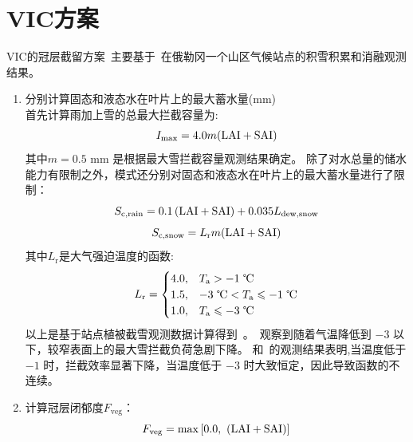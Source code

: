 \section{VIC方案}
VIC的冠层截留方案~\citep{liang1994simple,hamman2018variable}主要基于~\citet{storck2002measurement}在俄勒冈一个山区气候站点的积雪积累和消融观测结果。
\begin{enumerate}
  \item 分别计算固态和液态水在叶片上的最大蓄水量(mm)\\
    首先计算雨加上雪的总最大拦截容量为:
    \begin{equation}
      I_{\mathrm{max}} = 4.0 m ({\rm LAI}+{\rm SAI})
    \end{equation}
    其中$m=0.5$ mm 是根据最大雪拦截容量观测结果确定。
    除了对水总量的储水能力有限制之外，模式还分别对固态和液态水在叶片上的最大蓄水量进行了限制：
    \begin{equation}
      S_{\mathrm{c,rain}}=0.1\left({\rm LAI}+{\rm SAI}\right)+0.035 L_{\mathrm{dew,snow}}\\
    \end{equation}
    \begin{equation}
      S_{\mathrm{c,snow}}=L_{\mathrm {r}}  m ({\rm LAI}+{\rm SAI})
    \end{equation}
    其中$L_{\mathrm {r}} $是大气强迫温度的函数:
    \begin{equation}
      L_{\mathrm {r}}  = \begin{cases}
        4.0, & T_{\mathrm {a}}  > -1 \text{ \textcelsius}\\
        1.5, & -3 \text{ \textcelsius} < T_{\mathrm {a}}  \leqslant -1 \text{ \textcelsius}\\
        1.0, & T_{\mathrm {a}}  \leqslant -3 \text{ \textcelsius}
      \end{cases}
    \end{equation}
    以上是基于站点植被截雪观测数据计算得到~\citep{storck2002measurement}。\citet{kobayashi1987snow}~观察到随着气温降低到 $-3$ \textcelsius 以下，较窄表面上的最大雪拦截负荷急剧下降。 \citet{kobayashi1987snow}和~\citet{pfister1999snow}的观测结果表明,当温度低于 $-1$ \textcelsius 时，拦截效率显著下降，当温度低于 $-3$ \textcelsius 时大致恒定，因此导致函数的不连续。

  \item 计算冠层闭郁度$F_{\mathrm{veg}}$：
    \begin{equation}
      F_{\mathrm{veg}} = \max\left[0.0,\ ({\rm LAI}+{\rm SAI})\right]
    \end{equation}


\end{enumerate}
